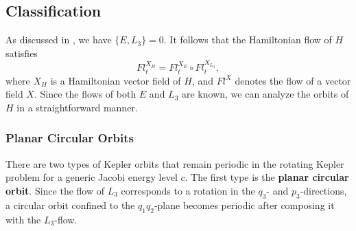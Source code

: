 \documentclass{amsart}
\begin{document}

\subsection{Classification}\label{Subsection - Classification of periodic orbits}

As discussed in , we have $\{E, L_3\} = 0$. It follows that the Hamiltonian flow of $H$ satisfies
$$
Fl^{X_H}_t = Fl^{X_E}_t \circ Fl^{X_{L_3}}_t,
$$
where $X_H$ is a Hamiltonian vector field of $H$, and $Fl^{X}$ denotes the flow of a vector field $X$.
Since the flows of both $E$ and $L_3$ are known, we can analyze the orbits of $H$ in a straightforward manner.

\subsubsection*{Planar Circular Orbits}

There are two types of Kepler orbits that remain periodic in the rotating Kepler problem for a generic Jacobi energy level $c$.
The first type is the \textbf{planar circular orbit}.
Since the flow of $L_3$ corresponds to a rotation in the $q_3$- and $p_3$-directions, a circular orbit confined to the $q_1q_2$-plane becomes periodic after composing it with the $L_3$-flow.
\end{document}
